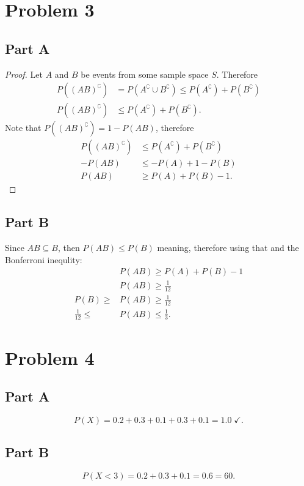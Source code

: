 \documentclass[12pt]{extarticle}
\begin{document}
\section*{Problem 3}
\subsection*{Part A}
% 
%
% 
\begin{proof}
	Let $A$ and $B$ be events from some sample space $S$. Therefore
	\begin{align*}
		P((AB)^\complement) &= P(A^\complement \cup B^\complement) \leq P(A^\complement) + P(B^\complement) \\
		P((AB)^\complement) & \leq P(A^\complement) + P(B^\complement)
	.\end{align*}
	Note that $P((AB)^\complement) = 1 - P(AB)$, therefore
	\begin{align*}
		P((AB)^\complement) & \leq P(A^\complement) + P(B^\complement) \\
		- P(AB) & \leq - P(A) + 1 - P(B) \\
		P(AB) & \geq P(A) + P(B) - 1
	.\end{align*}
\end{proof}

\subsection*{Part B}
Since $AB \subseteq B$, then $P(AB) \leq P(B)$ meaning, therefore using that and the Bonferroni inequlity:
\begin{align*}
	&P(AB) \geq P(A) + P(B) - 1 \\
	&P(AB) \geq \frac{1}{12} \\
	P(B) \geq &P(AB) \geq \frac{1}{12} \\
	\frac{1}{12} \leq &P(AB) \leq \frac{1}{3}
.\end{align*}

\section*{Problem 4}
\subsection*{Part A}
\[
	P(X) = 0.2 + 0.3 + 0.1 + 0.3 + 0.1 = 1.0 \;\checkmark
.\]

\subsection*{Part B}
\[
	P(X < 3) = 0.2 + 0.3 + 0.1 = 0.6 = 60%
.\]
\end{document}
